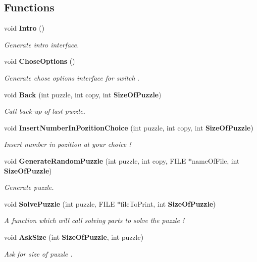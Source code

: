 \subsection*{Functions}
\begin{DoxyCompactItemize}
\item 
void {\bf Intro} ()
\begin{DoxyCompactList}\small\item\em Generate intro interface. \end{DoxyCompactList}\item 
void {\bf Chose\+Options} ()
\begin{DoxyCompactList}\small\item\em Generate chose options interface for switch . \end{DoxyCompactList}\item 
void {\bf Back} (int puzzle, int copy, int {\bf Size\+Of\+Puzzle})
\begin{DoxyCompactList}\small\item\em Call back-\/up of last puzzle. \end{DoxyCompactList}\item 
void {\bf Insert\+Number\+In\+Pozition\+Choice} (int puzzle, int copy, int {\bf Size\+Of\+Puzzle})
\begin{DoxyCompactList}\small\item\em Insert number in pozition at your choice ! \end{DoxyCompactList}\item 
void {\bf Generate\+Random\+Puzzle} (int puzzle, int copy, F\+I\+LE $\ast$name\+Of\+File, int {\bf Size\+Of\+Puzzle})
\begin{DoxyCompactList}\small\item\em Generate puzzle. \end{DoxyCompactList}\item 
void {\bf Solve\+Puzzle} (int puzzle, F\+I\+LE $\ast$file\+To\+Print, int {\bf Size\+Of\+Puzzle})
\begin{DoxyCompactList}\small\item\em A function which will call solving parts to solve the puzzle ! \end{DoxyCompactList}\item 
void {\bf Ask\+Size} (int {\bf Size\+Of\+Puzzle}, int puzzle)
\begin{DoxyCompactList}\small\item\em Ask for size of puzzle . \end{DoxyCompactList}\end{DoxyCompactItemize}


